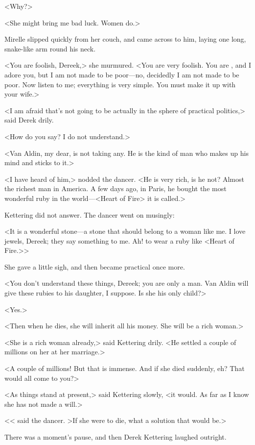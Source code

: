 <Why?>

<She might bring me bad luck. Women do.>

Mirelle slipped quickly from her couch, and came across to him, laying one long, snake-like arm round his neck.

<You are foolish, Dereek,> she murmured. <You are very foolish. You are , and I adore you, but I am not made to be poor—no, decidedly I am not made to be poor. Now listen to me; everything is very simple. You must make it up with your wife.>

<I am afraid that's not going to be actually in the sphere of practical politics,> said Derek drily.

<How do you say? I do not understand.>

<Van Aldin, my dear, is not taking any. He is the kind of man who makes up his mind and sticks to it.>

<I have heard of him,> nodded the dancer. <He is very rich, is he not? Almost the richest man in America. A few days ago, in Paris, he bought the most wonderful ruby in the world—<Heart of Fire> it is called.>

Kettering did not answer. The dancer went on musingly:

<It is a wonderful stone—a stone that should belong to a woman like me. I love jewels, Dereek; they say something to me. Ah! to wear a ruby like <Heart of Fire.>>

She gave a little sigh, and then became practical once more.

<You don't understand these things, Dereek; you are only a man. Van Aldin will give these rubies to his daughter, I suppose. Is she his only child?>

<Yes.>

<Then when he dies, she will inherit all his money. She will be a rich woman.>

<She is a rich woman already,> said Kettering drily. <He settled a couple of millions on her at her marriage.>

<A couple of millions! But that is immense. And if she died suddenly, eh? That would all come to you?>

<As things stand at present,> said Kettering slowly, <it would. As far as I know she has not made a will.>

<< said the dancer. >If she were to die, what a solution that would be.>

There was a moment's pause, and then Derek Kettering laughed outright.

